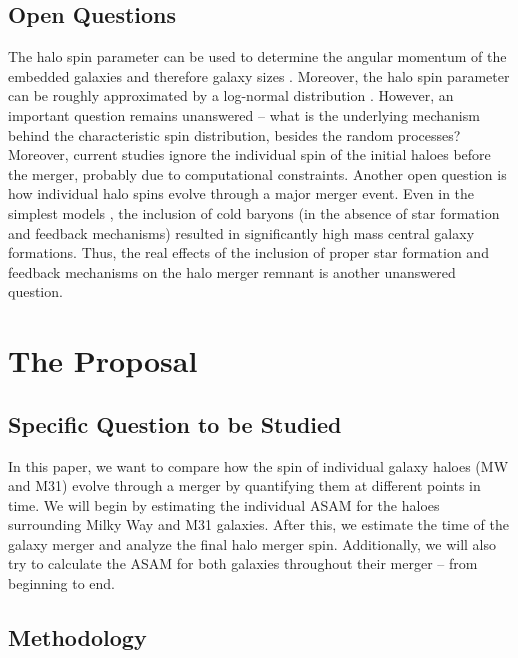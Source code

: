 \documentclass[twocolumn]{aastex631}
\begin{document}
\subsection{Open Questions}

The halo spin parameter can be used to determine the angular momentum of the embedded galaxies and therefore galaxy sizes \citep{1980MNRAS.193..189F}. Moreover, the halo spin parameter can be roughly approximated by a log-normal distribution \citep[][]{Bullock:2000ry}. However, an important question remains unanswered -- what is the underlying mechanism behind the characteristic spin distribution, besides the random processes? Moreover, current studies \citep[e.g.,][]{2019MNRAS.487..993D} ignore the individual spin of the initial haloes before the merger, probably due to computational constraints. Another open question is how individual halo spins evolve through a major merger event. Even in the simplest models \citep[like that in][]{2010MNRAS.407..435A}, the inclusion of cold baryons (in the absence of star formation and feedback mechanisms) resulted in significantly high mass central galaxy formations. Thus, the real effects of the inclusion of proper star formation and feedback mechanisms on the halo merger remnant is another unanswered question. 



\section{The Proposal} \label{sec:prop}

\subsection{Specific Question to be Studied}

In this paper, we want to compare how the spin of individual galaxy haloes (MW and M31) evolve through a merger by quantifying them at different points in time. We will begin by estimating the individual ASAM for the haloes surrounding Milky Way and M31 galaxies. After this, we estimate the time of the galaxy merger and analyze the final halo merger spin. Additionally, we will also try to calculate the ASAM for both galaxies throughout their merger -- from beginning to end. 

\subsection{Methodology}
\end{document}
